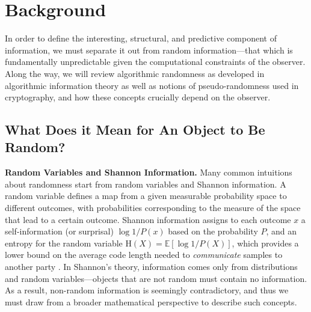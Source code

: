 \documentclass[twoside]{article}
\begin{document}
%
%
%
%
%
%

%

%
%
%

%
%


%

%
%
%
%
%
%

%


%
%

%
%
%
%
%

%
%

%

%
%
%
%
%

%
%
%
%
%
%

%
%
%
%
%
%
%
%
%

\section{Background}
In order to define the interesting, structural, and predictive component of information, we must separate it out from random information---that which is fundamentally unpredictable given the computational constraints of the observer. Along the way, we will review algorithmic randomness as developed in algorithmic information theory as well as notions of pseudo-randomness used in cryptography, and how these concepts crucially depend on the observer.

\subsection{What Does it Mean for An Object to Be Random?}
\textbf{Random Variables and Shannon Information.}
Many common intuitions about randomness start from random variables and Shannon information. A random variable defines a map from a given measurable probability space to different outcomes, with probabilities corresponding to the measure of the space that lead to a certain outcome. %
Shannon information assigns to each outcome $x$ a self-information (or surprisal) $\log 1/P(x)$ based on the probability $P$, and an entropy for the random variable $\mathrm{H}(X)=\mathbb{E}[\log 1/P(X)]$, which provides a lower bound on the average code length needed to \emph{communicate} samples to another party \citep{shannon1948mathematical}. In Shannon's theory, information comes only from distributions and random variables---objects that are not random must contain no information. As a result, non-random information is seemingly contradictory, and thus we must draw from a broader mathematical perspective to describe such concepts.
\end{document}
